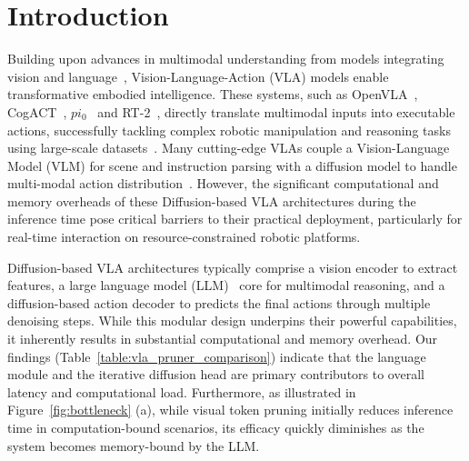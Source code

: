 
\section{Introduction}

Building upon advances in multimodal understanding from models integrating vision and language~\citep{awadalla2023openflamingo,li2022blip,radford2021learning,an2024mc,luo2024llm}, Vision-Language-Action (VLA) models enable transformative embodied intelligence. These systems, such as OpenVLA~\citep{kim24openvla}, CogACT~\citep{li2024CogACT}, $pi_0$~\citep{black2024pi_0} and RT-2~\citep{brohan2023rt2visionlanguageactionmodelstransfer}, directly translate multimodal inputs into executable actions, successfully tackling complex robotic manipulation and reasoning tasks using large-scale datasets~\citep{fang2024rh20t,o2024open}. Many cutting-edge VLAs couple a Vision-Language Model (VLM) for scene and instruction parsing with a diffusion model to handle multi-modal action distribution~\citep{li2024CogACT,wen2024diffusion,wen2025dexvla,wen2024tinyvla}. However, the significant computational and memory overheads of these Diffusion-based VLA architectures during the inference time pose critical barriers to their practical deployment, particularly for real-time interaction on resource-constrained robotic platforms.

Diffusion-based VLA architectures typically comprise a vision encoder to extract features, a large language model (LLM)~\citep{touvron2023llama,floridi2020gpt,openai2024gpt4technicalreport,liu2019robertarobustlyoptimizedbert,wang2025data} core for multimodal reasoning, and a diffusion-based action decoder to predicts the final actions through multiple denoising steps. While this modular design underpins their powerful capabilities, it inherently results in substantial computational and memory overhead. Our findings (Table~\ref{table:vla_pruner_comparison}) indicate that the language module and the iterative diffusion head are primary contributors to overall latency and computational load. Furthermore, as illustrated in Figure~\ref{fig:bottleneck} (a), while visual token pruning initially reduces inference time in computation-bound scenarios, its efficacy quickly diminishes as the system becomes memory-bound by the LLM.

